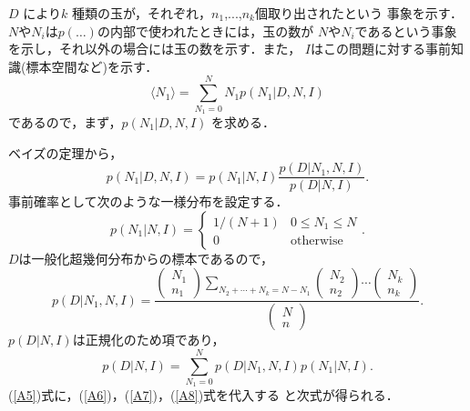 $D$ により$k$ 種類の玉が，それぞれ，$n_1$,...,$n_k$個取り出されたという
事象を示す．$N$や$N_i$は$p(\ldots)$の内部で使われたときには，玉の数が
$N$や$N_i$であるという事象を示し，それ以外の場合には玉の数を示す．また，
$I$はこの問題に対する事前知識(標本空間など)を示す．
\begin{equation}
  \label{A4}
  \langle N_1 \rangle = \sum_{N_1 = 0}^{N} N_1 p(N_1 | D,N,I) 
\end{equation}
であるので，まず，$p(N_1 | D,N,I)$ を求める．

ベイズの定理から，
\begin{equation}
  \label{A5}
  p(N_1 | D,N,I) = p(N_1 | N,I) \frac{p(D | N_1,N,I)}{p(D | N,I)}.
\end{equation}
事前確率として次のような一様分布を設定する．
\begin{equation}
  \label{A6}
  p(N_1 | N, I) = \left\{
    \begin{array}{ll}
      1/(N + 1) & 0 \le N_1 \le N \\
      0 & \mbox{otherwise}
    \end{array}
  \right..
\end{equation}
$D$は一般化超幾何分布からの標本であるので，
\begin{equation}
  \label{A7}
  p(D | N_1,N,I) = \frac{
    \left(
      \begin{array}{l}
        N_1 \\
        n_1
      \end{array}
    \right)
    \sum_{N_2 + \cdots + N_k = N - N_1}
    \left(
      \begin{array}{l}
        N_2 \\
        n_2
      \end{array}
    \right)
    \cdots
    \left(
      \begin{array}{l}
        N_k \\
        n_k
      \end{array}
    \right)
    }{
    \left(
      \begin{array}{l}
        N \\
        n
      \end{array}
    \right)
    }.
\end{equation}
$p(D | N,I)$は正規化のため項であり，
\begin{equation}
  \label{A8}
  p(D | N,I) = \sum_{N_1 = 0}^N p(D | N_1,N,I) p(N_1 | N,I).
\end{equation}
(\ref{A5})式に，(\ref{A6})，(\ref{A7})，(\ref{A8})式を代入する
と次式が得られる．
